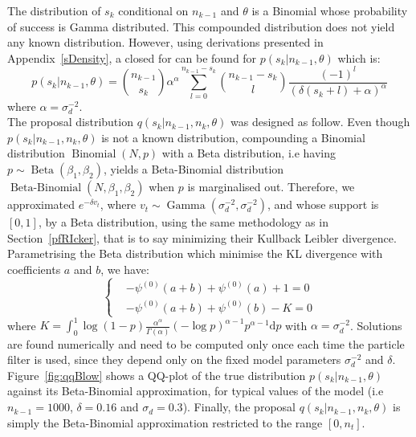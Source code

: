 \documentclass[12pt]{article}
\begin{document}
	The distribution of $s_k$ conditional on $n_{k-1}$ and $\theta$ is a Binomial whose probability of success is Gamma distributed. This compounded distribution does not yield any known distribution. However, using derivations presented in Appendix~\ref{sDensity}, a closed for can be found for $p(s_k|n_{k-1}, \theta)$ which is:
	\begin{equation*}
	p(s_k|n_{k-1}, \theta) = \binom{n_{k-1}}{s_k}\alpha^\alpha\sum_{l=0}^{n_{k-1}-s_k}\binom{n_{k-1}-s_k}{l}\frac{(-1)^l}{(\delta(s_k+l)+\alpha)^\alpha}
	\end{equation*}
	where $\alpha = \sigma_d^{-2}$. \\
	
	The proposal distribution $q(s_k|n_{k-1}, n_k, \theta)$ was designed as follow. Even though $p(s_k|n_{k-1}, n_k, \theta)$ is not a known distribution, compounding a Binomial distribution $\operatorname{Binomial}(N, p)$ with a Beta distribution, i.e having $p \sim \operatorname{Beta}(\beta_1,  \beta_2)$, yields a Beta-Binomial distribution $\operatorname{Beta-Binomial}(N, \beta_1, \beta_2)$ when $p$ is marginalised out. Therefore, we approximated $e^{-\delta v_t}$, where $v_t \sim \operatorname{Gamma}(\sigma_d^{-2}, \sigma_d^{-2})$, and whose support is $[0, 1]$, by a Beta distribution, using the same methodology as in Section~\ref{pfRIcker}, that is to say minimizing their Kullback Leibler divergence. Parametrising the Beta distribution which minimise the KL divergence with coefficients $a$ and $b$, we have:
	\[	\begin{cases}
	& -\psi^{(0)}(a+b) + \psi^{(0)}(a) + 1 = 0 \\
	& -\psi^{(0)}(a+b) + \psi^{(0)}(b) - K  = 0
	\end{cases}\]
	where $K=\int_{0}^{1}\log(1-p)\frac{\alpha^\alpha}{\Gamma(\alpha)}(-\log p)^{\alpha-1}p^{\alpha-1}\mathrm{d}p$ with $\alpha = \sigma_d^{-2}$. Solutions are found numerically and need to be computed only once each time the particle filter is used, since they depend only on the fixed model parameters $\sigma_d^{-2}$ and $\delta$. Figure~\ref{fig:qqBlow} shows a QQ-plot of the true distribution $p(s_k|n_{k-1}, \theta)$ against its Beta-Binomial approximation, for typical values of the model (i.e $n_{k-1} = 1000$, $\delta=0.16$ and $\sigma_d=0.3$). Finally, the proposal $q(s_k|n_{k-1}, n_k, \theta)$ is simply the Beta-Binomial approximation restricted to the range $[0, n_t]$.
	
\end{document}

